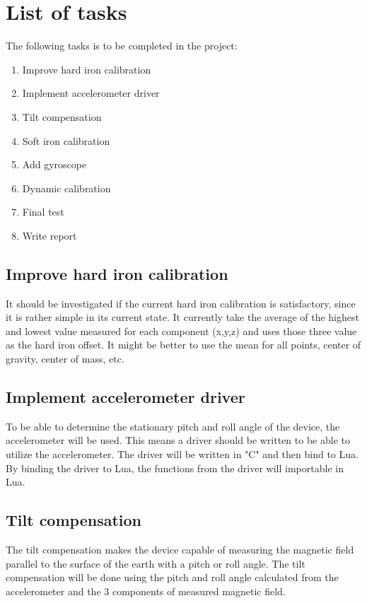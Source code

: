 \chapter{List of tasks}
The following tasks is to be completed in the project:
\begin{enumerate}
	\item Improve hard iron calibration
	\item Implement accelerometer driver
	\item Tilt compensation
	\item Soft iron calibration
	\item Add gyroscope
	\item Dynamic calibration
	\item Final test
	\item Write report
\end{enumerate}

\section{Improve hard iron calibration}
It should be investigated if the current hard iron calibration is satisfactory, since it is rather simple in its current state. It currently take the average of the highest and lowest value measured for each component (x,y,z) and uses those three value as the hard iron offset. It might be better to use the mean for all points, center of gravity, center of mass, etc.

\section{Implement accelerometer driver}
To be able to determine the stationary pitch and roll angle of the device, the accelerometer will be used. This means a driver should be written to be able to utilize the accelerometer. The driver will be written in "C" and then bind to Lua. By binding the driver to Lua, the functions from the driver will importable in Lua.

\section{Tilt compensation}
The tilt compensation makes the device capable of measuring the magnetic field parallel to the surface of the earth with a pitch or roll angle. The tilt compensation will be done using the pitch and roll angle calculated from the accelerometer and the 3 components of measured magnetic field. 

